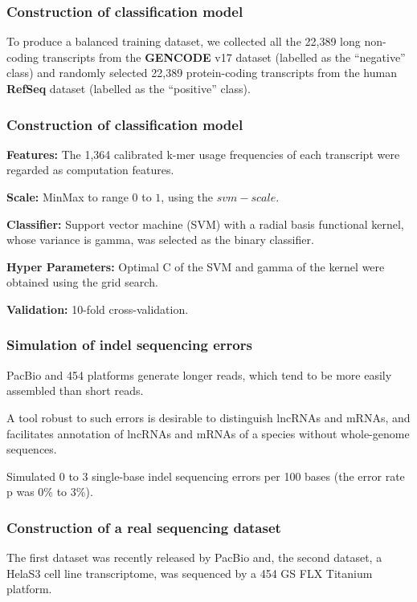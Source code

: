 \documentclass[hyperref={pdfpagelabels=false}]{beamer}
\begin{document}
\begin{frame}
\frametitle{Construction of classification model}
To produce a balanced training dataset, we collected all the 22,389 long non-coding transcripts from the \textbf{GENCODE} v17 dataset (labelled as the ``negative” class) and randomly selected 22,389 protein-coding transcripts from the human \textbf{RefSeq} dataset (labelled as the ``positive'' class).

\end{frame}

\begin{frame}
\frametitle{Construction of classification model}
\textbf{Features:} The 1,364 calibrated k-mer usage frequencies of each transcript were regarded as computation features.\pause

\textbf{Scale:} MinMax to range $0$ to $1$, using the $svm-scale$.\pause

\textbf{Classifier:} Support vector machine (SVM) with a radial basis functional kernel, whose variance is gamma, was selected as the binary classifier. \pause

\textbf{Hyper Parameters:}  Optimal C of the SVM and gamma of the kernel were obtained using the grid search. \pause

\textbf{Validation:} 10-fold cross-validation.

\end{frame}

\begin{frame}
\frametitle{Simulation of indel sequencing errors}
PacBio and 454 platforms generate longer reads, which tend to be more easily assembled than short reads. \pause

A tool robust to such errors is desirable to distinguish lncRNAs and mRNAs, and facilitates annotation of lncRNAs and mRNAs of a species without whole-genome sequences. \pause

Simulated 0 to 3 single-base indel sequencing errors per 100 bases (the
error rate p was 0\% to 3\%).

\end{frame}

\begin{frame}
\frametitle{Construction of a real sequencing dataset}

The first dataset was recently released by PacBio and, the second dataset, a HelaS3 cell line transcriptome, was sequenced by a 454 GS FLX Titanium platform.

\end{frame}
\end{document}

